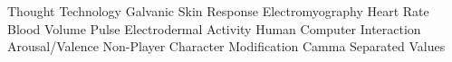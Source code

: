    {Thought Technology}
  {Galvanic Skin Response}
  {Electromyography}
   {Heart Rate}
  {Blood Volume Pulse}
  {Electrodermal Activity}
  {Human Computer Interaction}
   {Arousal/Valence}
  {Non-Player Character}
  {Modification}
  {Camma Separated Values}

